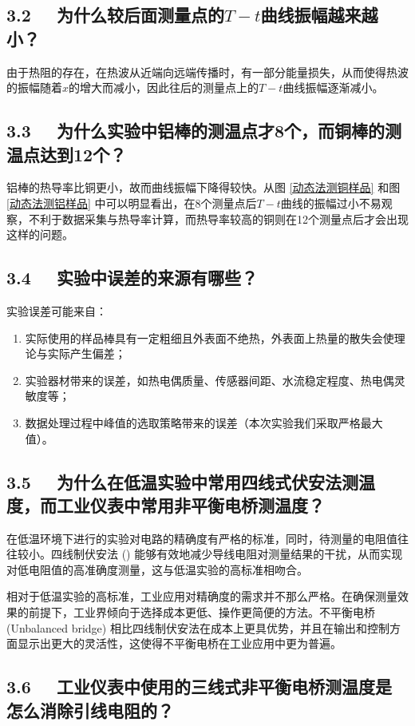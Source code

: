 \documentclass[UTF8]{article}
\theoremstyle{MyLineTheoremStyle} %
\theoremstyle{MyBlockTheoremStyle} %
\theoremstyle{MySubsubsectionStyle} %
\begin{document}
\subsection*{3.2 \ \ 为什么较后面测量点的$ T-t $曲线振幅越来越小？}
由于热阻的存在，在热波从近端向远端传播时，有一部分能量损失，从而使得热波的振幅随着$ x $的增大而减小，因此往后的测量点上的$ T-t $曲线振幅逐渐减小。

\subsection*{3.3 \ \ 为什么实验中铝棒的测温点才8个，而铜棒的测温点达到12个？}
铝棒的热导率比铜更小，故而曲线振幅下降得较快。从图 \ref{动态法测铜样品} 和图 \ref{动态法测铝样品} 中可以明显看出，在8个测量点后$ T-t $曲线的振幅过小不易观察，不利于数据采集与热导率计算，而热导率较高的铜则在12个测量点后才会出现这样的问题。

\subsection*{3.4 \ \ 实验中误差的来源有哪些？}
实验误差可能来自：
\begin{enumerate}
\item 实际使用的样品棒具有一定粗细且外表面不绝热，外表面上热量的散失会使理论与实际产生偏差；
\item 实验器材带来的误差，如热电偶质量、传感器间距、水流稳定程度、热电偶灵敏度等；
\item 数据处理过程中峰值的选取策略带来的误差（本次实验我们采取严格最大值）。
\end{enumerate}


\subsection*{3.5 \ \ 为什么在低温实验中常用四线式伏安法测温度，而工业仪表中常用非平衡电桥测温度？}
在低温环境下进行的实验对电路的精确度有严格的标准，同时，待测量的电阻值往往较小。四线制伏安法 () 能够有效地减少导线电阻对测量结果的干扰，从而实现对低电阻值的高准确度测量，这与低温实验的高标准相吻合。

相对于低温实验的高标准，工业应用对精确度的需求并不那么严格。在确保测量效果的前提下，工业界倾向于选择成本更低、操作更简便的方法。不平衡电桥 (Unbalanced bridge) 相比四线制伏安法在成本上更具优势，并且在输出和控制方面显示出更大的灵活性，这使得不平衡电桥在工业应用中更为普遍。


\subsection*{3.6 \ \ 工业仪表中使用的三线式非平衡电桥测温度是怎么消除引线电阻的？}
\end{document}
